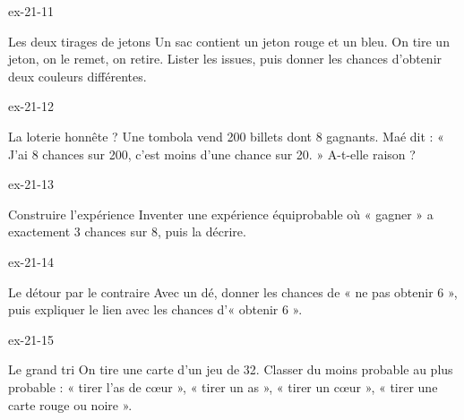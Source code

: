 \begin{blocLivre}{ex-21-11}\begin{exercice}[3]{Les deux tirages de jetons}
Un sac contient un jeton rouge et un bleu. On tire un jeton, on le remet, on retire. Lister les issues, puis donner les chances d’obtenir deux couleurs différentes.
\label{fig-ex-21-11}
\end{exercice}\end{blocLivre}
\begin{blocLivre}{ex-21-12}\begin{exercice}[3]{La loterie honnête ?}
Une tombola vend 200 billets dont 8 gagnants. Maé dit : « J’ai 8 chances sur 200, c’est moins d’une chance sur 20. » A-t-elle raison ?
\end{exercice}\end{blocLivre}
\begin{blocLivre}{ex-21-13}\begin{exercice}[3]{Construire l’expérience}
Inventer une expérience équiprobable où « gagner » a exactement 3 chances sur 8, puis la décrire.
\end{exercice}\end{blocLivre}
\begin{blocLivre}{ex-21-14}\begin{exercice}[3]{Le détour par le contraire}
Avec un dé, donner les chances de « ne pas obtenir 6 », puis expliquer le lien avec les chances d’« obtenir 6 ».
\end{exercice}\end{blocLivre}
\begin{blocLivre}{ex-21-15}\begin{exercice}[3]{Le grand tri}
On tire une carte d’un jeu de 32. Classer du moins probable au plus probable : « tirer l’as de cœur », « tirer un as », « tirer un cœur », « tirer une carte rouge ou noire ».
\end{exercice}\end{blocLivre}

\clearpage
